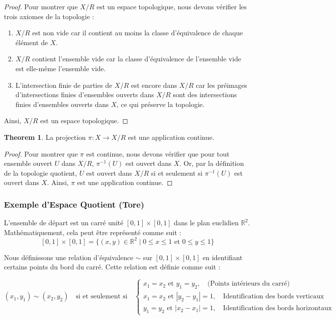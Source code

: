 \documentclass{article}
\theoremstyle{definition}
\newtheorem{theorem}{Theorem}[section]
\theoremstyle{plain}
\begin{document}
\begin{proof}
Pour montrer que $X/R$ est un espace topologique, nous devons vérifier les trois axiomes de la topologie :
\begin{enumerate}
\item $X/R$ est non vide car il contient au moins la classe d'équivalence de chaque élément de $X$.
\item $X/R$ contient l'ensemble vide car la classe d'équivalence de l'ensemble vide est elle-même l'ensemble vide.
\item L'intersection finie de parties de $X/R$ est encore dans $X/R$ car les préimages d'intersections finies d'ensembles ouverts dans $X/R$ sont des intersections finies d'ensembles ouverts dans $X$, ce qui préserve la topologie.
\end{enumerate}
Ainsi, $X/R$ est un espace topologique.
\end{proof}

\begin{theorem}
La projection $\pi : X \rightarrow X/R$ est une application continue.
\end{theorem}

\begin{proof}
Pour montrer que $\pi$ est continue, nous devons vérifier que pour tout ensemble ouvert $U$ dans $X/R$, $\pi^{-1}(U)$ est ouvert dans $X$. Or, par la définition de la topologie quotient, $U$ est ouvert dans $X/R$ si et seulement si $\pi^{-1}(U)$ est ouvert dans $X$. Ainsi, $\pi$ est une application continue.
\end{proof}

\subsubsection{Exemple d'Espace Quotient (Tore)}

L'ensemble de départ est un carré unité $[0, 1] \times [0, 1]$ dans le plan euclidien $\mathbb{R}^2$. Mathématiquement, cela peut être représenté comme suit :
\[
[0, 1] \times [0, 1] = \{(x, y) \in \mathbb{R}^2 \mid 0 \leq x \leq 1 \text{ et } 0 \leq y \leq 1\}
\]

Nous définissons une relation d'équivalence $\sim$ sur $[0, 1] \times [0, 1]$ en identifiant certains points du bord du carré. Cette relation est définie comme suit :

\[
    (x_1, y_1) \sim (x_2, y_2) \quad \text{si et seulement si} \quad
    \begin{cases}
        x_1 = x_2 \text{ et } y_1 = y_2, \quad \text{(Points intérieurs du carré)} \\
        x_1 = x_2 \text{ et } |y_2 - y_1| = 1, \quad \text{Identification des bords verticaux} \\
        y_1 = y_2 \text{ et } |x_2 - x_1| = 1, \quad \text{Identification des bords horizontaux}
    \end{cases}
\]
\end{document}
